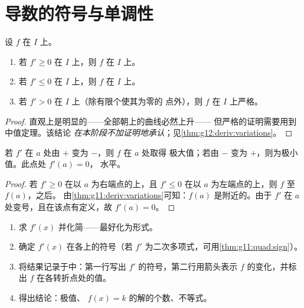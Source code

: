 \section{导数的符号与单调性}

\begin{theorem}[导数与单调性]\label{thm:g11:deriv:variations}
设 $f$ 在 $I$ 上。
\begin{enumerate}
  \item 若 $f' \geq 0$ 在 $I$ 上，则 $f$ 在 $I$ 上。
  \item 若 $f' \leq 0$ 在 $I$ 上，则 $f$ 在 $I$ 上。
  \item 若 $f' > 0$ 在 $I$ 上（除有限个使其为零的
        点外），则 $f$ 在 $I$ 上严格。
\end{enumerate}
\end{theorem}

\begin{proof}
直观上是明显的——全部朝上的曲线必然上升——
但严格的证明需要用到中值定理。该结论
\emph{在本阶段不加证明地承认}；见\cref{thm:g12:deriv:variations}。
\end{proof}

\begin{proposition}[极值]\label{prop:g11:deriv:extrema}
若 $f'$ 在 $a$ 处由 $+$ 变为 $-$，则 $f$ 在 $a$ 处取得
极大值；若由 $-$ 变为 $+$，则为极小值。此点处 $f'(a) = 0$，
水平。
\end{proposition}

\begin{proof}
若 $f' \geq 0$ 在以 $a$ 为右端点的上，且 $f' \leq 0$
在以 $a$ 为左端点的上，则 $f$ 至 $f(a)$，之后。
由\cref{thm:g11:deriv:variations}可知：$f(a)$ 是附近的。由于 $f'$
在 $a$ 处变号，且在该点有定义，故 $f'(a) = 0$。
\end{proof}

\begin{method}[研究函数]\label{met:g11:deriv:study}
\begin{enumerate}
  \item 求 $f'(x)$ 并化简——最好化为形式。
  \item 确定 $f'(x)$ 在各上的符号（若
        $f'$ 为二次多项式，可用\cref{thm:g11:quad:sign}）。
  \item 将结果记录于\emph{}中：第一行写出
        $f'$ 的符号，第二行用箭头表示 $f$ 的变化，并标出
        $f$ 在各转折点处的值。
  \item 得出结论：极值、 $f(x) = k$ 的解的个数、不等式。
\end{enumerate}
\end{method}


